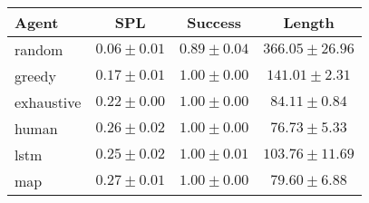 \begin{tabular}{lccc}
    \toprule
    Agent & SPL & Success & Length \\
    \midrule
    random & $0.06 \pm 0.01$ & $0.89 \pm 0.04$ & $366.05 \pm 26.96$\\
    greedy & $0.17 \pm 0.01$ & $1.00 \pm 0.00$ & $141.01 \pm 2.31$\\
    exhaustive & $0.22 \pm 0.00$ & $1.00 \pm 0.00$ & $84.11 \pm 0.84$\\
    human & $0.26 \pm 0.02$ & $1.00 \pm 0.00$ & $76.73 \pm 5.33$\\
    lstm & $0.25 \pm 0.02$ & $1.00 \pm 0.01$ & $103.76 \pm 11.69$\\
    map & $0.27 \pm 0.01$ & $1.00 \pm 0.00$ & $79.60 \pm 6.88$\\
    \bottomrule
\end{tabular}